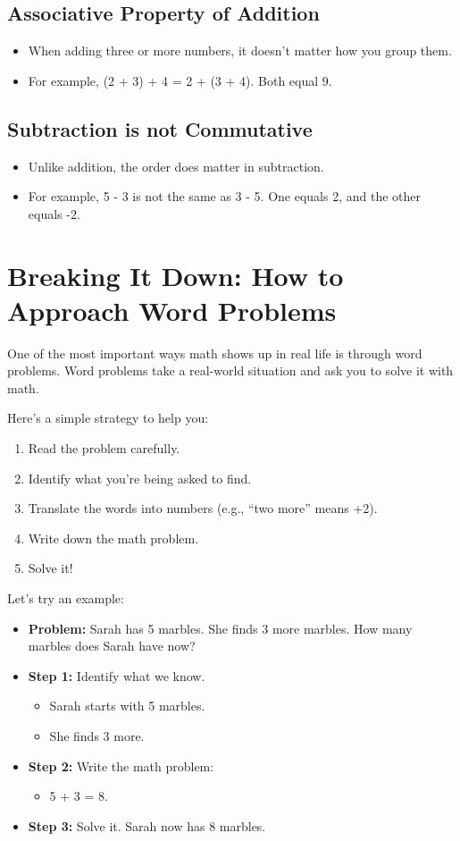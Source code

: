 \subsection{Associative Property of Addition}
\begin{itemize}
    \item When adding three or more numbers, it doesn’t matter how you group them.
    \item For example, (2 + 3) + 4 = 2 + (3 + 4). Both equal 9.
\end{itemize}

\subsection{Subtraction is not Commutative}
\begin{itemize}
    \item Unlike addition, the order does matter in subtraction.
    \item For example, 5 - 3 is not the same as 3 - 5. One equals 2, and the other equals -2.
\end{itemize}

\section{Breaking It Down: How to Approach Word Problems}
One of the most important ways math shows up in real life is through word problems. Word problems take a real-world situation and ask you to solve it with math.

Here’s a simple strategy to help you:
\begin{enumerate}
    \item Read the problem carefully.
    \item Identify what you’re being asked to find.
    \item Translate the words into numbers (e.g., “two more” means +2).
    \item Write down the math problem.
    \item Solve it!
\end{enumerate}

Let’s try an example:
\begin{itemize}
    \item \textbf{Problem:} Sarah has 5 marbles. She finds 3 more marbles. How many marbles does Sarah have now?
    \item \textbf{Step 1:} Identify what we know.
    \begin{itemize}
        \item Sarah starts with 5 marbles.
        \item She finds 3 more.
    \end{itemize}
    \item \textbf{Step 2:} Write the math problem:
    \begin{itemize}
        \item 5 + 3 = 8.
    \end{itemize}
    \item \textbf{Step 3:} Solve it. Sarah now has 8 marbles.
\end{itemize}

